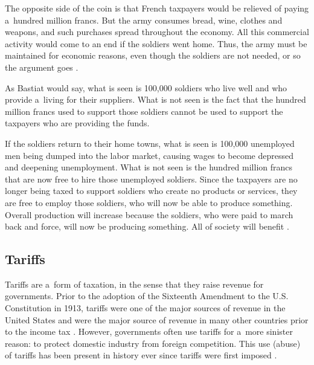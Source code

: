 The opposite side of the coin is that French taxpayers would be relieved of paying a~hundred million francs. But the army consumes bread, wine, clothes and weapons, and such purchases spread throughout the economy. All this commercial activity would come to an end if the soldiers went home. Thus, the army must be maintained for economic reasons, even though the soldiers are not needed, or so the argument goes 
\parencite[][pp.4–5]{bastiat_selected_1964}.%




As Bastiat would say, what is seen is 100,000 soldiers who live well and who provide a~living for their suppliers. What is not seen is the fact that the hundred million francs used to support those soldiers cannot be used to support the taxpayers who are providing the funds.



If the soldiers return to their home towns, what is seen is 100,000 unemployed men being dumped into the labor market, causing wages to become depressed and deepening unemployment. What is not seen is the hundred million francs that are now free to hire those unemployed soldiers. Since the taxpayers are no longer being taxed to support soldiers who create no products or services, they are free to employ those soldiers, who will now be able to produce something. Overall production will increase because the soldiers, who were paid to march back and force, will now be producing something. All of society will benefit 
\parencite[][pp.6–7]{bastiat_selected_1964}.%




\subsection{Tariffs }



Tariffs are a~form of taxation, in the sense that they raise revenue for governments. Prior to the adoption of the Sixteenth Amendment to the U.S. Constitution in 1913, tariffs were one of the major sources of revenue in the United States and were the major source of revenue in many other countries prior to the income tax 
\parencite[][pp.269–270]{webber_history_1986}. %
 However, governments often use tariffs for a~more sinister reason: to protect domestic industry from foreign competition. This use (abuse) of tariffs has been present in history ever since tariffs were first imposed 
\parencite[][]{webber_history_1986}.%




